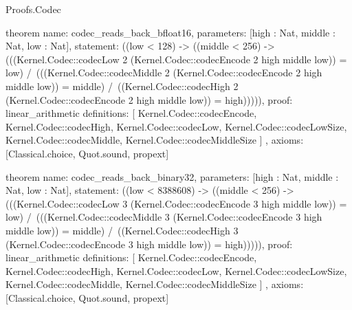 \begin{lexlean}{Proofs.Codec}
\begin{semanticmodule}
theorem{
  name: codec_reads_back_bfloat16,
  parameters: [high : Nat, middle : Nat, low : Nat],
  statement: ((low < 128) -> ((middle < 256) -> (((Kernel.Codec::codecLow 2 (Kernel.Codec::codecEncode 2 high middle low)) = low) /\ (((Kernel.Codec::codecMiddle 2 (Kernel.Codec::codecEncode 2 high middle low)) = middle) /\ ((Kernel.Codec::codecHigh 2 (Kernel.Codec::codecEncode 2 high middle low)) = high))))),
  proof: linear_arithmetic{
    definitions: [
      Kernel.Codec::codecEncode,
      Kernel.Codec::codecHigh,
      Kernel.Codec::codecLow,
      Kernel.Codec::codecLowSize,
      Kernel.Codec::codecMiddle,
      Kernel.Codec::codecMiddleSize
    ]
  },
  axioms: [Classical.choice, Quot.sound, propext]
}

theorem{
  name: codec_reads_back_binary32,
  parameters: [high : Nat, middle : Nat, low : Nat],
  statement: ((low < 8388608) -> ((middle < 256) -> (((Kernel.Codec::codecLow 3 (Kernel.Codec::codecEncode 3 high middle low)) = low) /\ (((Kernel.Codec::codecMiddle 3 (Kernel.Codec::codecEncode 3 high middle low)) = middle) /\ ((Kernel.Codec::codecHigh 3 (Kernel.Codec::codecEncode 3 high middle low)) = high))))),
  proof: linear_arithmetic{
    definitions: [
      Kernel.Codec::codecEncode,
      Kernel.Codec::codecHigh,
      Kernel.Codec::codecLow,
      Kernel.Codec::codecLowSize,
      Kernel.Codec::codecMiddle,
      Kernel.Codec::codecMiddleSize
    ]
  },
  axioms: [Classical.choice, Quot.sound, propext]
}
\end{semanticmodule}
\end{lexlean}
